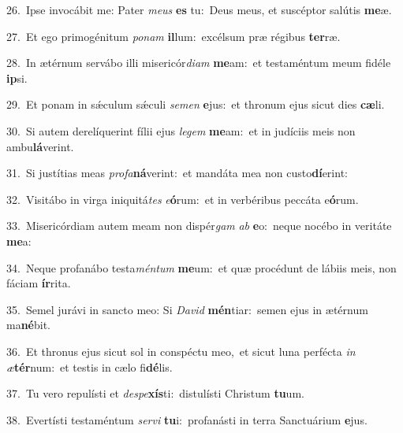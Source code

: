 {\numbfont\textcolor{\numbcolor}{26.}}~Ipse invocábit me: Pater \textit{me}\-\textit{us} \textbf{es} tu:~\star Deus meus, et suscéptor salútis \textbf{me}\-æ.\par
{\numbfont\textcolor{\numbcolor}{27.}}~Et ego primogénitum \textit{po}\-\textit{nam} \textbf{il}\-lum:~\star excélsum præ régibus \textbf{ter}\-ræ.\par
{\numbfont\textcolor{\numbcolor}{28.}}~In ætérnum servábo illi misericór\-\textit{di}\-\textit{am} \textbf{me}\-am:~\star et testaméntum meum fidéle \textbf{ip}\-si.\par
{\numbfont\textcolor{\numbcolor}{29.}}~Et ponam in sǽculum sǽculi \textit{se}\-\textit{men} \textbf{e}\-jus:~\star et thronum ejus sicut dies \textbf{cæ}\-li.\par
{\numbfont\textcolor{\numbcolor}{30.}}~Si autem derelíquerint fílii ejus \textit{le}\-\textit{gem} \textbf{me}\-am:~\star et in judíciis meis non ambu\-\textbf{lá}\-verint.\par
{\numbfont\textcolor{\numbcolor}{31.}}~Si justítias meas \textit{pro}\-\textit{fa}\textbf{ná}verint:~\star et mandáta mea non custo\-\textbf{dí}\-erint:\par
{\numbfont\textcolor{\numbcolor}{32.}}~Visitábo in virga iniquitá\textit{tes} \textit{e}\-\textbf{ó}rum:~\star et in verbéribus peccáta e\-\textbf{ó}\-rum.\par
{\numbfont\textcolor{\numbcolor}{33.}}~Misericórdiam autem meam non dispér\textit{gam} \textit{ab} \textbf{e}\-o:~\star neque nocébo in veritáte \textbf{me}\-a:\par
{\numbfont\textcolor{\numbcolor}{34.}}~Neque profanábo testa\-\textit{mén}\-\textit{tum} \textbf{me}\-um:~\star et quæ procédunt de lábiis meis, non fáciam \textbf{ír}\-rita.\par
{\numbfont\textcolor{\numbcolor}{35.}}~Semel jurávi in sancto meo: Si \textit{Da}\-\textit{vid} \textbf{mén}\-tiar:~\star semen ejus in ætérnum ma\-\textbf{né}\-bit.\par
{\numbfont\textcolor{\numbcolor}{36.}}~Et thronus ejus sicut sol in conspéctu meo,~\dagger et sicut luna perfécta \textit{in} \textit{æ}\-\textbf{tér}num:~\star et testis in cælo fi\-\textbf{dé}\-lis.\par
{\numbfont\textcolor{\numbcolor}{37.}}~Tu vero repulísti et \textit{de}\-\textit{spe}\textbf{xís}ti:~\star distulísti Christum \textbf{tu}\-um.\par
{\numbfont\textcolor{\numbcolor}{38.}}~Evertísti testaméntum \textit{ser}\-\textit{vi} \textbf{tu}\-i:~\star profanásti in terra Sanctuárium \textbf{e}\-jus.\par
